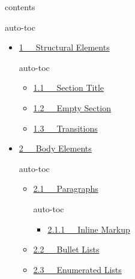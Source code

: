\documentclass[a4paper]{article}
\begin{document}



\pagebreak[4] %

\label{table-of-contents}

\begin{DUclass}{contents}


\begin{DUclass}{auto-toc}
\begin{itemize}
\item \hyperref[structural-elements]{1   Structural Elements}

\begin{DUclass}{auto-toc}
\begin{itemize}
\item \hyperref[section-title]{1.1   Section Title}

\item \hyperref[empty-section]{1.2   Empty Section}

\item \hyperref[transitions]{1.3   Transitions}
\end{itemize}
\end{DUclass}

\item \hyperref[body-elements]{2   Body Elements}

\begin{DUclass}{auto-toc}
\begin{itemize}
\item \hyperref[paragraphs]{2.1   Paragraphs}

\begin{DUclass}{auto-toc}
\begin{itemize}
\item \hyperref[inline-markup]{2.1.1   Inline Markup}
\end{itemize}
\end{DUclass}

\item \hyperref[bullet-lists]{2.2   Bullet Lists}

\item \hyperref[enumerated-lists]{2.3   Enumerated Lists}


\end{itemize}
\end{DUclass}
\end{itemize}
\end{DUclass}
\end{DUclass}
\end{document}
